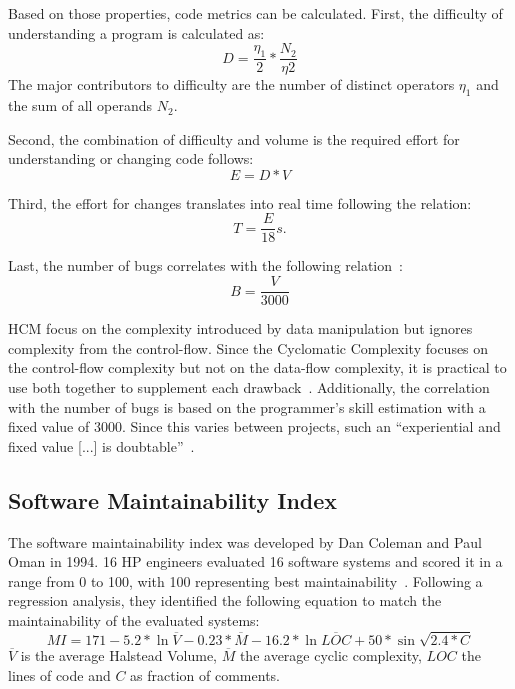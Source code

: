 Based on those properties, code metrics can be calculated. 
First, the difficulty of understanding a program is calculated as:
\begin{displaymath}
    D = \frac{\eta_1}{2} * \frac{N_2}{\eta2}
\end{displaymath}
The major contributors to difficulty are the number of distinct operators $\eta_1$ and the sum of all operands $N_2$.

Second, the combination of difficulty and volume is the required effort for understanding or changing code follows:
\begin{displaymath}
    E = D * V
\end{displaymath}

Third, the effort for changes translates into real time following the relation:
\begin{displaymath}
    T = \frac{E}{18}s.
\end{displaymath}

Last, the number of bugs correlates with the following relation~\cite{yu_survey_2010}:
\begin{displaymath}
    B = \frac{V}{3000}
\end{displaymath}

HCM focus on the complexity introduced by data manipulation but ignores complexity from the control-flow. Since the Cyclomatic Complexity focuses on the control-flow complexity but not on the data-flow complexity, it is practical to use both together to supplement each drawback~\cite{yu_survey_2010}.
Additionally, the correlation with the number of bugs is based on the programmer's skill estimation with a fixed value of 3000. Since this varies between projects, such an \enquote{experiential and fixed value [...] is doubtable}~\cite{yu_survey_2010}.

\subsection{Software Maintainability Index}
The software maintainability index was developed by Dan Coleman and Paul Oman in 1994. 16 HP engineers evaluated 16 software systems and scored it in a range from 0 to 100, with 100 representing best maintainability~\cite{coleman_using_1994}. 
Following a regression analysis, they identified the following equation to match the maintainability of the evaluated systems:
\begin{displaymath}
MI = 171 - 5.2 *\ln{\overline{V}} - 0.23 * \overline{M} - 16.2 * \ln{\overline{LOC}} + 50 * \sin{\sqrt{2.4 * C}}
\end{displaymath}
$\overline{V}$ is the average Halstead Volume, $\overline{M}$ the average cyclic complexity, $LOC$ the lines of code and $C$ as fraction of comments.

